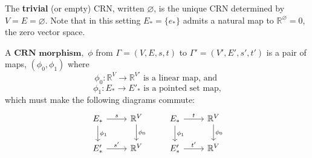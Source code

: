 \documentclass[11pt, one side, article]{memoir}
\newcommand{\define}[1]{\textbf{#1}}
\newcommand{\R}{\mathbb{R}}
\begin{document}
\begin{example}
    The \define{trivial} (or empty) CRN, written $\varnothing$, is the unique CRN determined by $V=E=\varnothing$.
    Note that in this setting $E_*=\{e_*\}$ admits a natural map to $\R^{\varnothing}=0$, the zero vector space.
\end{example}


\begin{definition}\label{defn:CRN-morphism}
    A $\define{CRN morphism},$ $\phi$ from $\Gamma = (V, E, s, t)$ to $\Gamma' = (V', E', s', t')$ is a pair of maps, $(\phi_0, \phi_1)$ where
    \begin{equation}
        \phi_0: \mathbb{R}^{V} \to \mathbb{R}^{V'} \text{ is a linear map, and }
    \end{equation}
    \begin{equation}
        \phi_1: E_* \to E'_* \text{ is a pointed set map,}
    \end{equation}
    which must make the following diagrams commute:
    \begin{equation}
        \begin{tikzcd}
    	E_* & {\mathbb{R}^V} & E_* & {\mathbb{R}^V} \\
    	{E'_*} & {\mathbb{R}^V} & {E'_*} & {\mathbb{R}^V}
    	\arrow["s", from=1-1, to=1-2]
    	\arrow["{\phi_1}", from=1-1, to=2-1]
    	\arrow["{\phi_0}", from=1-2, to=2-2]
    	\arrow["t", from=1-3, to=1-4]
    	\arrow["{\phi_1}", from=1-3, to=2-3]
    	\arrow["{\phi_0}", from=1-4, to=2-4]
    	\arrow["{s'}", from=2-1, to=2-2]
    	\arrow["{t'}", from=2-3, to=2-4]
        \end{tikzcd}
    \end{equation}
\end{definition}
\end{document}
